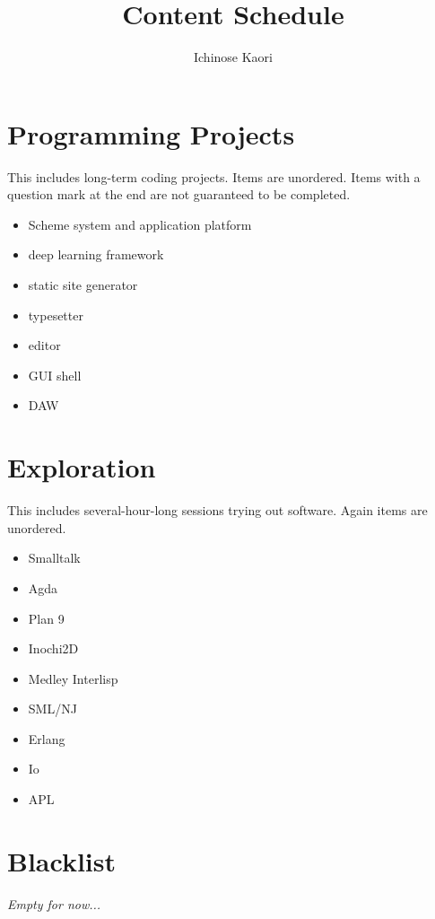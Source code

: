\documentclass{article}
\title{Content Schedule}
\author{Ichinose Kaori}
\begin{document}
\maketitle

\section{Programming Projects}

This includes long-term coding projects. Items are unordered. Items with a question mark at the end are not guaranteed to be completed.

\begin{itemize}
\item Scheme system and application platform
\item deep learning framework
\item static site generator
\item typesetter
\item editor
\item GUI shell
\item DAW
\end{itemize}

\section{Exploration}

This includes several-hour-long sessions trying out software. Again items are unordered.

\begin{itemize}
\item Smalltalk
\item Agda
\item Plan 9
\item Inochi2D
\item Medley Interlisp
\item SML/NJ
\item Erlang
\item Io
\item APL
\end{itemize}

\section{Blacklist}

\textit{Empty for now...}
\end{document}
